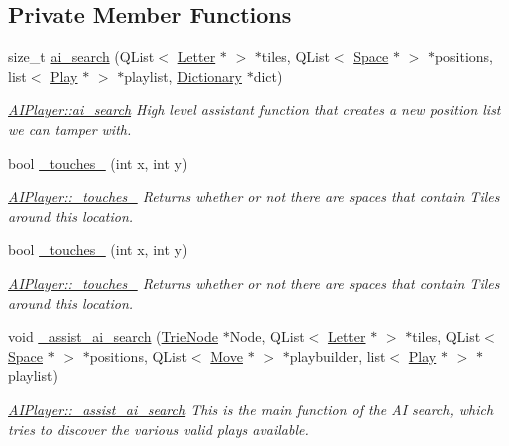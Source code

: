 \subsection*{Private Member Functions}
\begin{DoxyCompactItemize}
\item 
size\-\_\-t \hyperlink{class_a_i_player_af50ad9f1d7a27e87ec67fe9ddb49ef93}{ai\-\_\-search} (Q\-List$<$ \hyperlink{class_letter}{Letter} $\ast$ $>$ $\ast$tiles, Q\-List$<$ \hyperlink{class_space}{Space} $\ast$ $>$ $\ast$positions, list$<$ \hyperlink{class_play}{Play} $\ast$ $>$ $\ast$playlist, \hyperlink{class_dictionary}{Dictionary} $\ast$dict)
\begin{DoxyCompactList}\small\item\em \hyperlink{class_a_i_player_af50ad9f1d7a27e87ec67fe9ddb49ef93}{A\-I\-Player\-::ai\-\_\-search} High level assistant function that creates a new position list we can tamper with. \end{DoxyCompactList}\item 
bool \hyperlink{class_a_i_player_a3bcac2df2a8f171dfedfa594855294af}{\-\_\-touches\-\_} (int x, int y)
\begin{DoxyCompactList}\small\item\em \hyperlink{class_a_i_player_a3bcac2df2a8f171dfedfa594855294af}{A\-I\-Player\-::\-\_\-touches\-\_} Returns whether or not there are spaces that contain Tiles around this location. \end{DoxyCompactList}\item 
bool \hyperlink{class_a_i_player_a158fb1339fc845f8b057d71b6e2f6381}{\-\_\-touches\-\_} (int x, int y)
\begin{DoxyCompactList}\small\item\em \hyperlink{class_a_i_player_a158fb1339fc845f8b057d71b6e2f6381}{A\-I\-Player\-::\-\_\-touches\-\_} Returns whether or not there are spaces that contain Tiles around this location. \end{DoxyCompactList}\item 
void \hyperlink{class_a_i_player_afdf893cf47209d106740f56c1d37c334}{\-\_\-assist\-\_\-ai\-\_\-search} (\hyperlink{class_trie_node}{Trie\-Node} $\ast$Node, Q\-List$<$ \hyperlink{class_letter}{Letter} $\ast$ $>$ $\ast$tiles, Q\-List$<$ \hyperlink{class_space}{Space} $\ast$ $>$ $\ast$positions, Q\-List$<$ \hyperlink{class_move}{Move} $\ast$ $>$ $\ast$playbuilder, list$<$ \hyperlink{class_play}{Play} $\ast$ $>$ $\ast$playlist)
\begin{DoxyCompactList}\small\item\em \hyperlink{class_a_i_player_afdf893cf47209d106740f56c1d37c334}{A\-I\-Player\-::\-\_\-assist\-\_\-ai\-\_\-search} This is the main function of the A\-I search, which tries to discover the various valid plays available. \end{DoxyCompactList}\end{DoxyCompactItemize}

